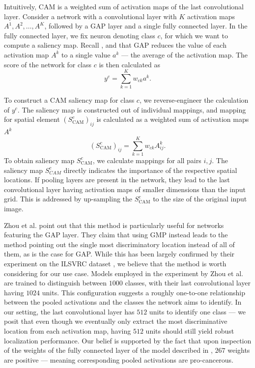 Intuitively, CAM is a weighted sum of activation maps of the last convolutional layer.
Consider a network with a convolutional layer with $K$ activation maps $A^1, A^2, \ldots, A^K$, followed by a GAP layer and a single fully connected layer.
In the fully connected layer, we fix neuron denoting class $c$, for which we want to compute a saliency map.
Recall , and that GAP reduces the value of each activation map $A^k$ to a single value $a^k$ --- the average of the activation map.
The score of the network for class $c$ is then calculated as
\begin{equation}\label{eq:gap-score}
    y^c = \sum_{k=1}^K w_{ck} a^k.
\end{equation}

To construct a CAM saliency map for class $c$, we reverse-engineer the calculation of $y^c$. The saliency map is constructed out of individual mappings, and mapping for spatial element $(S^c_{\text{CAM}})_{ij}$ is calculated as a weighted sum of activation maps $A^k$
\begin{equation}\label{eq:cam}
    (S^c_{\text{CAM}})_{ij} = \sum_{k=1}^K w_{ck}  A^k_{ij}.
\end{equation}
To obtain saliency map $S^c_{\text{CAM}}$, we calculate mappings for all pairs $i, j$.
The saliency map $S^c_{CAM}$ directly indicates the importance of the respective spatial locations.
If pooling layers are present in the network, they lead to the last convolutional layer having activation maps of smaller dimensions than the input grid.
This is addressed by up-sampling the $S^c_{\text{CAM}}$ to the size of the original input image.

Zhou et al. \cite{cam} point out that this method is particularly useful for networks featuring the GAP layer.
They claim that using GMP instead leads to the method pointing out the single most discriminatory location instead of all of them, as is the case for GAP.
While this has been largely confirmed by their experiment on the ILSVRC dataset \cite{ilsvrc}, we believe that the method is worth considering for our use case.
Models employed in the experiment by Zhou et al. \cite{cam} are trained to distinguish between $1000$ classes, with their last convolutional layer having $1024$ units.
This configuration suggests a roughly one-to-one relationship between the pooled activations and the classes the network aims to identify.
In our setting, the last convolutional layer has $512$ units to identify one class --- we posit that even though we eventually only extract the most discriminative location from each activation map, having $512$ units should still yield robust localization performance.
Our belief is supported by the fact that upon inspection of the weights of the fully connected layer of the model described in , $267$ weights are positive --- meaning corresponding pooled activations are pro-cancerous.

